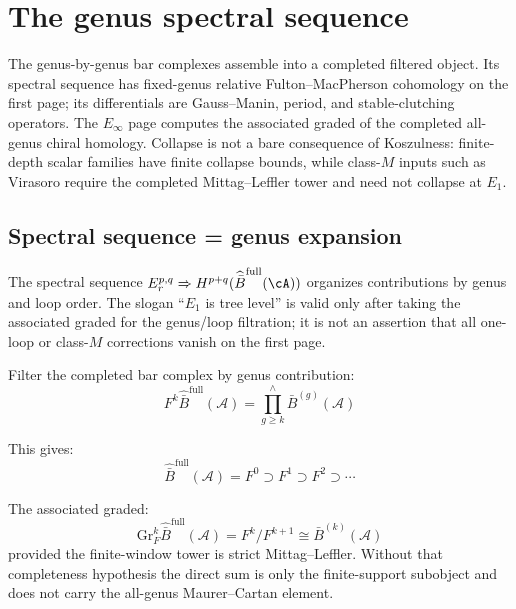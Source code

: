 \section{The genus spectral sequence}
\label{sec:genus-spectral-complete}

The genus-by-genus bar complexes assemble into a completed filtered
object. Its spectral sequence has fixed-genus relative
Fulton--MacPherson cohomology on the first page; its differentials are
Gauss--Manin, period, and stable-clutching operators. The
$E_\infty$ page computes the associated graded of the completed
all-genus chiral homology. Collapse is not a bare consequence of
Koszulness: finite-depth scalar families have finite collapse bounds,
while class-$M$ inputs such as Virasoro require the completed
Mittag--Leffler tower and need not collapse at $E_1$.

\subsection{Spectral sequence = genus expansion}

\begin{remark}
\label{rem:ss-genus}
The spectral sequence
$E_r^{p,q}\Rightarrow H^{p+q}(\widehat{\bar B}^{\mathrm{full}}(\cA))$
organizes contributions by genus and loop order. The slogan
``$E_1$ is tree level'' is valid only after taking the associated
graded for the genus/loop filtration; it is not an assertion that
all one-loop or class-$M$ corrections vanish on the first page.
\end{remark}

\begin{definition}
\label{def:genus-filtration-complete}
Filter the completed bar complex by genus contribution:
\begin{equation}
F^k\widehat{\bar{B}}^{\mathrm{full}}(\mathcal{A})
=
\prod_{g \geq k}^{\wedge}\bar{B}^{(g)}(\mathcal{A})
\end{equation}

This gives:
\begin{equation}
\widehat{\bar{B}}^{\mathrm{full}}(\mathcal{A})
=F^0\supset F^1\supset F^2\supset\cdots
\end{equation}

The associated graded:
\begin{equation}
\mathrm{Gr}^k_F
\widehat{\bar{B}}^{\mathrm{full}}(\mathcal{A})
=F^k/F^{k+1}
\cong
\bar{B}^{(k)}(\mathcal{A})
\end{equation}
provided the finite-window tower is strict Mittag--Leffler. Without
that completeness hypothesis the direct sum is only the finite-support
subobject and does not carry the all-genus Maurer--Cartan element.
\end{definition}

